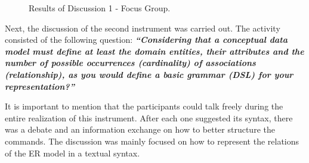 \documentclass[a4paper,twoside,anonymous]{article}
\begin{document}
\begin{figure}[!htb]
    \centering
    
    \caption{Results of Discussion 1 - Focus Group.}
    \label{fig:disc1GPfocalGrafico}
\end{figure}

Next, the discussion of the second instrument was carried out.
The activity consisted of the following question:
\textit{\textbf{``Considering that a conceptual data model must define at least the domain entities, their attributes and the number of possible occurrences (cardinality) of associations (relationship), as you would define a basic grammar (DSL) for your representation?''}}

It is important to mention that the participants could talk freely during the entire realization of this instrument.
After each one suggested its syntax, there was a debate and an information exchange on how to better structure the commands.
The discussion was mainly focused on how to represent the relations of the ER model in a textual syntax.
\end{document}
